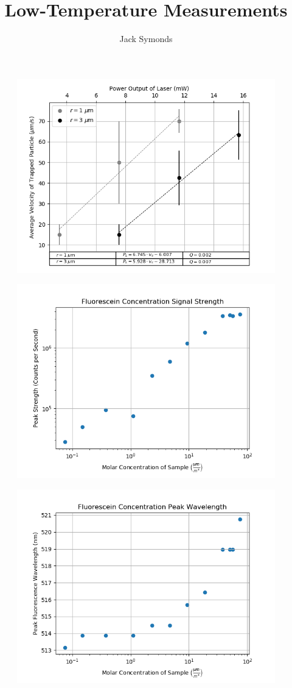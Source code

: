 \documentclass[8pt, a4paper]{article}
\title{Low-Temperature Measurements}
\author{Jack Symonds}
\date{}
\begin{document}
\begin{figure}[h!]
\includegraphics{qval.png}
\end{figure}

\begin{figure}[h!]
\includegraphics{conc.png}
\end{figure}

\begin{figure}[h!]
\includegraphics{conc_wav.png}
\end{figure}
\end{document}
